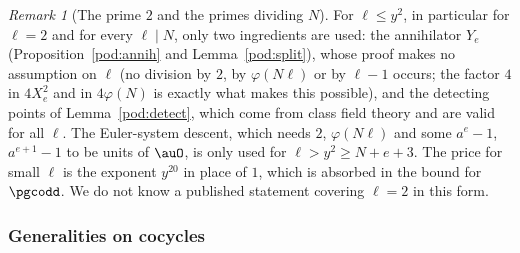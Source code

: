 \documentclass[10pt]{amsart}
\theoremstyle{definition}
\theoremstyle{remark}
\newtheorem{remark}[theorem]{Remark}
\begin{document}
\begin{remark}[The prime $2$ and the primes dividing $N$]\label{pod:rem-two}
For $\ell\le y^2$, in particular for $\ell=2$ and for every $\ell\mid N$, only two ingredients are
used: the annihilator $Y_e$ (Proposition~\ref{pod:annih} and Lemma~\ref{pod:split}), whose proof
makes no assumption on $\ell$ (no division by $2$, by $\varphi(N\ell)$ or by $\ell-1$ occurs; the
factor $4$ in $4X_e^2$ and in $4\varphi(N)$ is exactly what makes this possible), and the detecting
points of Lemma~\ref{pod:detect}, which come from class field theory and are valid for all $\ell$.
The Euler-system descent, which needs $2$, $\varphi(N\ell)$ and some $a^e-1$, $a^{e+1}-1$ to be units
of $\auO$, is only used for $\ell>y^2\ge N+e+3$. The price for small $\ell$ is the exponent $y^{20}$
in place of $1$, which is absorbed in the bound for $\pgcodd$. We do not know a published statement
covering $\ell=2$ in this form.
\end{remark}

\subsubsection{Generalities on cocycles}\label{pod:ss-gen}
\end{document}
